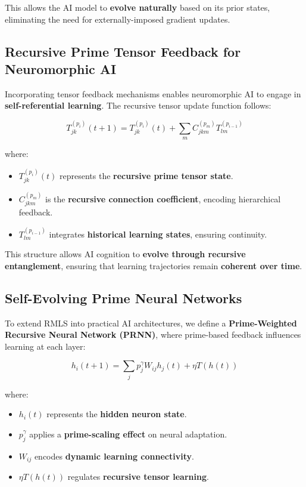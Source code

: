 \documentclass{article}
\theoremstyle{plain}
\theoremstyle{plain}
\theoremstyle{definition}
\theoremstyle{remark}
\begin{document}
This allows the AI model to \textbf{evolve naturally} based on its prior states, eliminating the need for externally-imposed gradient updates.

\subsection{Recursive Prime Tensor Feedback for Neuromorphic AI}

Incorporating tensor feedback mechanisms enables neuromorphic AI to engage in \textbf{self-referential learning}. The recursive tensor update function follows:

\begin{equation}
T_{jk}^{(p_i)}(t+1) = T_{jk}^{(p_i)}(t) + \sum_{m} C_{jkm}^{(p_m)} T_{lm}^{(p_{i-1})}
\end{equation}

where:
\begin{itemize}
    \item $T_{jk}^{(p_i)}(t)$ represents the \textbf{recursive prime tensor state}.
    \item $C_{jkm}^{(p_m)}$ is the \textbf{recursive connection coefficient}, encoding hierarchical feedback.
    \item $T_{lm}^{(p_{i-1})}$ integrates \textbf{historical learning states}, ensuring continuity.
\end{itemize}

This structure allows AI cognition to \textbf{evolve through recursive entanglement}, ensuring that learning trajectories remain \textbf{coherent over time}.

\subsection{Self-Evolving Prime Neural Networks}

To extend RMLS into practical AI architectures, we define a \textbf{Prime-Weighted Recursive Neural Network (PRNN)}, where prime-based feedback influences learning at each layer:

\begin{equation}
h_i (t+1) = \sum_{j} p_j^{\gamma} W_{ij} h_j (t) + \eta T(h(t))
\end{equation}

where:
\begin{itemize}
    \item $h_i (t)$ represents the \textbf{hidden neuron state}.
    \item $p_j^{\gamma}$ applies a \textbf{prime-scaling effect} on neural adaptation.
    \item $W_{ij}$ encodes \textbf{dynamic learning connectivity}.
    \item $\eta T(h(t))$ regulates \textbf{recursive tensor learning}.
\end{itemize}
\end{document}
